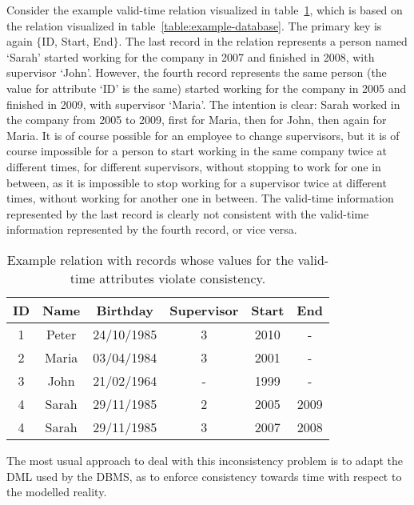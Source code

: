 \begin{example}
\label{ex:prob}
Consider the example valid-time relation visualized in table~\ref{table:erconsistency}, which is based on the relation visualized in table~\ref{table:example-database}. The primary key is again $\{$ID, Start, End$\}$. The last record in the relation represents a person named `Sarah' started working for the company in 2007 and finished in 2008, with supervisor `John'. However, the fourth record represents the same person (the value for attribute `ID' is the same) started working for the company in 2005 and finished in 2009, with supervisor `Maria'. The intention is clear: Sarah worked in the company from 2005 to 2009, first for Maria, then for John, then again for Maria. It is of course possible for an employee to change supervisors, but it is of course impossible for a person to start working in the same company twice at different times, for different supervisors, without stopping to work for one in between, as it is impossible to stop working for a supervisor twice at different times, without working for another one in between. The valid-time information represented by the last record is clearly not consistent with the valid-time information represented by the fourth record, or vice versa.
\end{example}

\begin{table}
\centering
\caption{Example relation with records whose values for the valid-time attributes violate consistency.}
\begin{tabular}{c c c c c c }
\hline
\textbf{ID} & \textbf{Name} & \textbf{Birthday} & \textbf{Supervisor} & \textbf{Start} & \textbf{End} \\ \hline
1 & Peter & 24/10/1985 & 3 &  2010 & - \\
2 & Maria & 03/04/1984 & 3 & 2001 & - \\
3 & John & 21/02/1964 & - &  1999 & - \\
4 & Sarah & 29/11/1985 & 2 &  2005 & 2009 \\
4 & Sarah & 29/11/1985 & 3 &  2007 & 2008 \\
\hline 
\end{tabular}
\label{table:erconsistency}
\end{table}

The most usual approach to deal with this inconsistency problem is to adapt the DML used by the DBMS, as to enforce consistency towards time with respect to the modelled reality.

